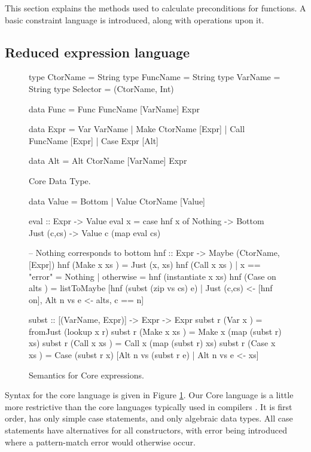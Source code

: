 \documentclass[preprint]{sigplanconf}
\begin{document}
This section explains the methods used to calculate preconditions for functions. A basic constraint language is introduced, along with operations upon it.

\subsection{Reduced expression language}
\label{sec:core}

\begin{figure}
\begin{code}
type CtorName  =  String
type FuncName  =  String
type VarName   =  String
type Selector  =  (CtorName, Int)

data Func  =  Func FuncName [VarName] Expr

data Expr  =  Var   VarName
           |  Make  CtorName  [Expr]
           |  Call  FuncName  [Expr]
           |  Case  Expr      [Alt]

data Alt   =  Alt CtorName [VarName] Expr
\end{code}
\caption{Core Data Type.}
\label{fig:core}
\end{figure}

\begin{figure}
\begin{code}
data Value = Bottom | Value CtorName [Value]

eval :: Expr -> Value
eval x = case  hnf x of
               Nothing      -> Bottom
               Just (c,cs)  -> Value c (map eval cs)

-- Nothing corresponds to bottom
hnf :: Expr -> Maybe (CtorName, [Expr])
hnf (Make  x   xs    )  =  Just (x, xs)
hnf (Call  x   xs    )  |  x == "error"  = Nothing
                        |  otherwise     = hnf (instantiate x xs)
hnf (Case  on  alts  )  =  listToMaybe [hnf (subst (zip vs cs) e)
       | Just (c,cs) <- [hnf on], Alt n vs e <- alts, c == n]

subst :: [(VarName, Expr)] -> Expr -> Expr
subst r (Var   x     ) = fromJust (lookup x r)
subst r (Make  x xs  ) = Make  x (map (subst r) xs)
subst r (Call  x xs  ) = Call  x (map (subst r) xs)
subst r (Case  x xs  ) = Case (subst r x)
    [Alt n vs (subst r e) | Alt n vs e <- xs]
\end{code}
\caption{Semantics for Core expressions.}
\label{fig:semantics}
\end{figure}

Syntax for the core language is given in Figure \ref{fig:core}. Our Core language is a little more restrictive than the core languages typically used in compilers \citep{ghc_core}. It is first order, has only simple case statements, and only algebraic data types. All case statements have alternatives for all constructors, with error being introduced where a pattern-match error would otherwise occur.
\end{document}
